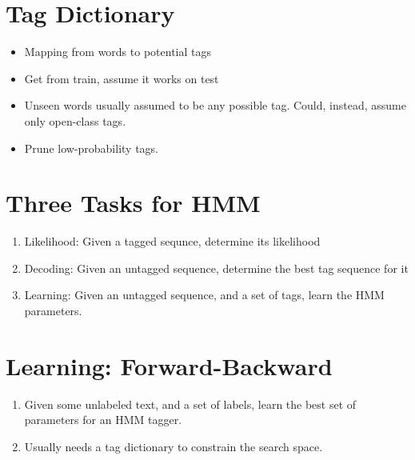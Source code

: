 \documentclass[11pt,letterpaper]{article}
\begin{document}
\begin{figure}[h]
\caption{}
\end{figure} 








\section{Tag Dictionary}

\begin{itemize}
  \item Mapping from words to potential tags
  \item Get from train, assume it works on test
  \item Unseen words usually assumed to be any possible tag.  Could, instead, assume only open-class tags.
  \item Prune low-probability tags.
\end{itemize}



\section{Three Tasks for HMM}

\begin{enumerate}
  \item Likelihood: Given a tagged sequnce, determine its likelihood
  \item Decoding: Given an untagged sequence, determine the best tag sequence for it
  \item Learning: Given an untagged sequence, and a set of tags, learn the HMM parameters.
\end{enumerate}


\section{Learning: Forward-Backward}

\begin{enumerate}
  \item Given some unlabeled text, and a set of labels, learn the best set of parameters for an HMM tagger.
  \item Usually needs a tag dictionary to constrain the search space.

\end{enumerate}
\end{document}

